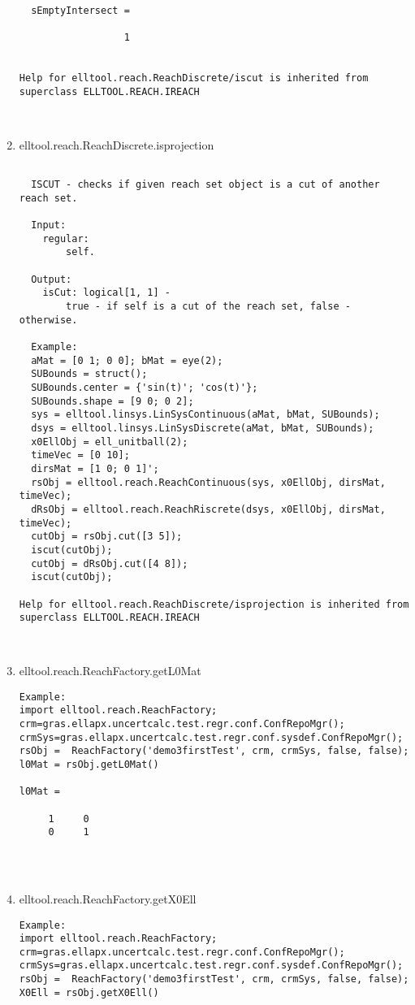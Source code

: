 \begin{enumerate}
\begin{lstlisting}
  sEmptyIntersect =

                  1


Help for elltool.reach.ReachDiscrete/iscut is inherited from superclass ELLTOOL.REACH.IREACH



\end{lstlisting}
\fontfamily{\familydefault}
\selectfont
\item {elltool.reach.ReachDiscrete.isprojection}
\selectfont
\begin{lstlisting}

  ISCUT - checks if given reach set object is a cut of another reach set.

  Input:
    regular:
        self.

  Output:
    isCut: logical[1, 1] -
        true - if self is a cut of the reach set, false - otherwise.

  Example:
  aMat = [0 1; 0 0]; bMat = eye(2);
  SUBounds = struct();
  SUBounds.center = {'sin(t)'; 'cos(t)'};
  SUBounds.shape = [9 0; 0 2];
  sys = elltool.linsys.LinSysContinuous(aMat, bMat, SUBounds);
  dsys = elltool.linsys.LinSysDiscrete(aMat, bMat, SUBounds);
  x0EllObj = ell_unitball(2);
  timeVec = [0 10];
  dirsMat = [1 0; 0 1]';
  rsObj = elltool.reach.ReachContinuous(sys, x0EllObj, dirsMat, timeVec);
  dRsObj = elltool.reach.ReachRiscrete(dsys, x0EllObj, dirsMat, timeVec);
  cutObj = rsObj.cut([3 5]);
  iscut(cutObj);
  cutObj = dRsObj.cut([4 8]);
  iscut(cutObj);

Help for elltool.reach.ReachDiscrete/isprojection is inherited from superclass ELLTOOL.REACH.IREACH



\end{lstlisting}
\fontfamily{\familydefault}
\selectfont
\item {elltool.reach.ReachFactory.getL0Mat}
\selectfont
\begin{lstlisting}
Example:
import elltool.reach.ReachFactory;
crm=gras.ellapx.uncertcalc.test.regr.conf.ConfRepoMgr();
crmSys=gras.ellapx.uncertcalc.test.regr.conf.sysdef.ConfRepoMgr();
rsObj =  ReachFactory('demo3firstTest', crm, crmSys, false, false);
l0Mat = rsObj.getL0Mat()

l0Mat =

     1     0
     0     1




\end{lstlisting}
\fontfamily{\familydefault}
\selectfont
\item {elltool.reach.ReachFactory.getX0Ell}
\selectfont
\begin{lstlisting}
Example:
import elltool.reach.ReachFactory;
crm=gras.ellapx.uncertcalc.test.regr.conf.ConfRepoMgr();
crmSys=gras.ellapx.uncertcalc.test.regr.conf.sysdef.ConfRepoMgr();
rsObj =  ReachFactory('demo3firstTest', crm, crmSys, false, false);
X0Ell = rsObj.getX0Ell()


\end{lstlisting}
\end{enumerate}

